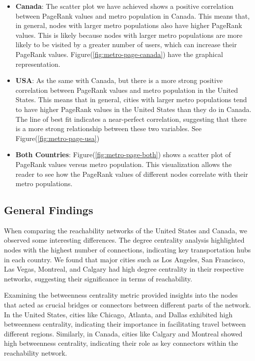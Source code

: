 \begin{itemize}
    \item \textbf{Canada}: The scatter plot we have achieved shows a positive correlation between PageRank values and metro population in Canada. This means that, in general, nodes with larger metro populations also have higher PageRank values. This is likely because nodes with larger metro populations are more likely to be visited by a greater number of users, which can increase their PageRank values. Figure(\ref{fig:metro-page-canada}) have the graphical representation.

    \item \textbf{USA}: As the same with Canada, but there is a more strong positive correlation between PageRank values and metro population in the United States. This means that in general, cities with larger metro populations tend to have higher PageRank values in the United States than they do in Canada. The line of best fit indicates a near-perfect correlation, suggesting that there is a more strong relationship between these two variables. See Figure(\ref{fig:metro-page-usa})

    \item \textbf{Both Countries}: Figure(\ref{fig:metro-page-both}) shows a scatter plot of PageRank values versus metro population. This visualization allows the reader to see how the PageRank values of different nodes correlate with their metro populations.
\end{itemize}






\subsection{General Findings}

When comparing the reachability networks of the United States and Canada, we observed some interesting differences. The degree centrality analysis highlighted nodes with the highest number of connections, indicating key transportation hubs in each country. We found that major cities such as Los Angeles, San Francisco, Las Vegas, Montreal, and Calgary had high degree centrality in their respective networks, suggesting their significance in terms of reachability.

Examining the betweenness centrality metric provided insights into the nodes that acted as crucial bridges or connectors between different parts of the network. In the United States, cities like Chicago, Atlanta, and Dallas exhibited high betweenness centrality, indicating their importance in facilitating travel between different regions. Similarly, in Canada, cities like Calgary and Montreal showed high betweenness centrality, indicating their role as key connectors within the reachability network.

